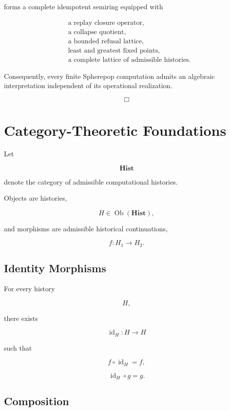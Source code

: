 \documentclass[12pt,oneside]{article}
\theoremstyle{definition}
\theoremstyle{remark}
\begin{document}
forms a complete idempotent semiring equipped with

\[
\begin{aligned}
&\text{a replay closure operator},\\
&\text{a collapse quotient},\\
&\text{a bounded refusal lattice},\\
&\text{least and greatest fixed points},\\
&\text{a complete lattice of admissible histories}.
\end{aligned}
\]

Consequently, every finite Spherepop computation admits an algebraic
interpretation independent of its operational realization.

\[
\Box
\]

\section{Category-Theoretic Foundations}

Let

\[
\mathbf{Hist}
\]

denote the category of admissible computational histories.

Objects are histories,

\[
H
\in
\operatorname{Ob}(\mathbf{Hist}),
\]

and morphisms are admissible historical continuations,

\[
f:H_1\rightarrow H_2.
\]

\subsection*{Identity Morphisms}

For every history

\[
H,
\]

there exists

\[
\operatorname{id}_H
:
H
\rightarrow
H
\]

such that

\[
f\circ\operatorname{id}_H=f,
\]

\[
\operatorname{id}_H\circ g=g.
\]

\subsection*{Composition}
\end{document}
